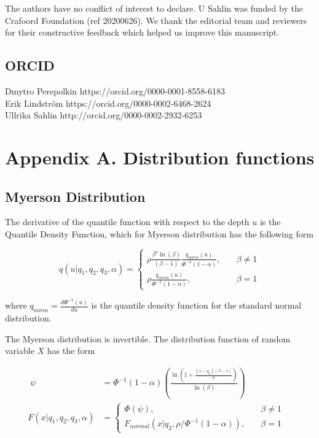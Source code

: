 \documentclass[
]{interact}
\begin{document}
The authors have no conflict of interest to declare. U Sahlin was funded
by the Crafoord Foundation (ref 20200626). We thank the editorial team
and reviewers for their constructive feedback which helped us improve
this manuscript.

\subsection*{ORCID}\label{orcid}

Dmytro Perepolkin https://orcid.org/0000-0001-8558-6183\\
Erik Lindström https://orcid.org/0000-0002-6468-2624\\
Ullrika Sahlin http://orcid.org/0000-0002-2932-6253

\section*{Appendix A. Distribution
functions}\label{appendix-a.-distribution-functions}

\subsection*{Myerson Distribution}\label{myerson-distribution-1}

The derivative of the quantile function with respect to the depth \(u\)
is the Quantile Density Function, which for Myerson distribution has the
following form

\[
q(u\vert q_1,q_2,q_3,\alpha)=\begin{cases}
\rho\frac{\beta^\kappa\ln(\beta)}{(\beta-1)}\frac{q_{norm}(u)}{\Phi^{-1}(1-\alpha)}, \quad &\beta \neq 1\\
\rho\frac{q_{norm}(u)}{\Phi^{-1}(1-\alpha)}, \quad &\beta = 1
\end{cases}
\]

where \(q_{norm}=\frac{d\Phi^{-1}(u)}{du}\) is the quantile density
function for the standard normal distribution.

The Myerson distribution is invertible. The distribution function of
random variable \(X\) has the form

\[
\begin{aligned}\;
\psi&=\Phi^{-1}(1-\alpha)\left(\frac{\ln\left(1+\frac{(x-q_2)(\beta-1)}{\rho}\right)}{\ln(\beta)}\right)&\\
F(x\vert q_1, q_2, q_3, \alpha)&=\begin{cases}
\Phi(\psi), \quad &\beta\neq 1\\
F_{normal}(x\vert q_2,\rho/\Phi^{-1}(1-\alpha) ), \quad &\beta=1
\end{cases}
\end{aligned}
\]
\end{document}

